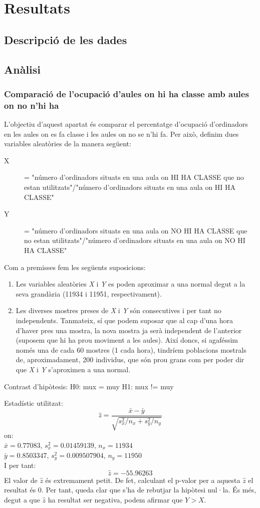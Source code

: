 \section{Resultats}

\subsection{Descripció de les dades}


\subsection{Anàlisi}
\subsubsection{Comparació de l'ocupació d'aules on hi ha classe amb aules on no n'hi ha}
L'objectiu d'aquest apartat és comparar el percentatge d'ocupació d'ordinadors en les aules on es fa classe i les aules on no se n'hi fa. Per això, definim dues variables aleatòries de la manera següent:
\begin{description}
	\item[X] = "número d'ordinadors situats en una aula on HI HA CLASSE que no estan utilitzats"/"número d'ordinadors situats en una aula on HI HA CLASSE"
	\item[Y] = "número d'ordinadors situats en una aula on NO HI HA CLASSE que no estan utilitzats"/"número d'ordinadors situats en una aula on NO HI HA CLASSE"
\end{description}

Com a premisses fem les següents suposicions:
\begin{enumerate}
	\item Les variables aleatòries \emph{X} i \emph{Y} es poden aproximar a una normal degut a la seva grandària (11934 i 11951, respectivament).
	\item Les diverses mostres preses de \emph{X} i \emph{Y} són consecutives i per tant no independents. Tanmateix, sí que podem suposar que al cap d'una hora d'haver pres una mostra, la nova mostra ja serà independent de l'anterior (suposem que hi ha prou moviment a les aules). Així doncs, si agaféssim només una de cada 60 mostres (1 cada hora), tindríem poblacions mostrals de, aproximadament, 200 individus, que són prou grans com per poder dir que \emph{X} i \emph{Y} s'aproximen a una normal.
\end{enumerate}

Contrast d'hipòtesis:
H0: mux = muy
H1: mux != muy

Estadístic utilitzat:
$$\hat{z} = \frac{\bar{x} - \bar{y}}{\sqrt{s_x^2/n_x + s_y^2/n_y}} $$
on: \\
$\bar{x} = 0.77083$,
$s^2_x = 0.01459139$,
$n_x = 11934$ \\
$\bar{y} = 0.8503347$,
$s^2_y = 0.009507904$,
$n_y = 11950$
\\

I per tant:
$$\hat{z} = -55.96263$$
El valor de $\hat{z}$ és extremament petit. De fet, calculant el p-valor per a aquesta $\hat{z}$ el resultat és 0. Per tant, queda clar que s'ha de rebutjar la hipòtesi nul·la. És més, degut a que $\hat{z}$ ha resultat ser negativa, podem afirmar que $Y>X$.
